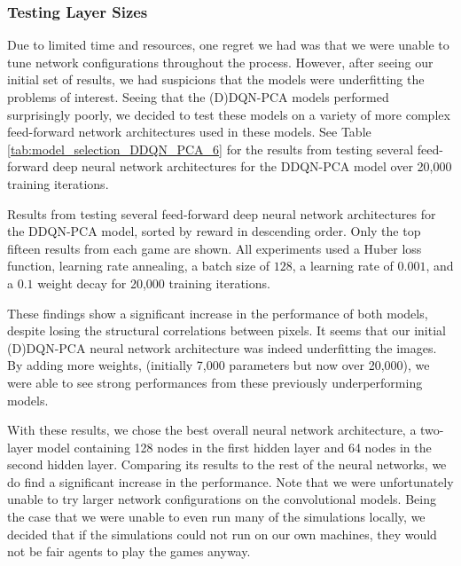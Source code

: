 \documentclass[11pt]{article}
\begin{document}
\subsubsection{Testing Layer Sizes}

Due to limited time and resources, one regret we had was that we were unable to tune network configurations throughout the process. However, after seeing our initial set of results, we had suspicions that the models were underfitting the problems of interest. Seeing that the (D)DQN-PCA models performed surprisingly poorly, we decided to test these models on a variety of more complex feed-forward network architectures used in these models. See Table \ref{tab:model_selection_DDQN_PCA_6} for the results from testing several feed-forward deep neural network architectures for the DDQN-PCA model over 20,000 training iterations.

\begin{table}[!ht]
    \footnotesize
    \centering
    
    
    \caption{Results from testing several feed-forward deep neural network architectures for the DDQN-PCA model, sorted by reward in descending order. Only the top fifteen results from each game are shown. All experiments used a Huber loss function, learning rate annealing, a batch size of $128$, a learning rate of $0.001$, and a $0.1$ weight decay for 20,000 training iterations.}
    \label{tab:model_selection_DDQN_PCA_6}
\end{table}

These findings show a significant increase in the performance of both models, despite losing the structural correlations between pixels. It seems that our initial (D)DQN-PCA neural network architecture was indeed underfitting the images. By adding more weights, (initially 7,000 parameters but now over 20,000), we were able to see strong performances from these previously underperforming models.

With these results, we chose the best overall neural network architecture, a two-layer model containing 128 nodes in the first hidden layer and 64 nodes in the second hidden layer. Comparing its results to the rest of the neural networks, we do find a significant increase in the performance. Note that we were unfortunately unable to try larger network configurations on the convolutional models. Being the case that we were unable to even run many of the simulations locally, we decided that if the simulations could not run on our own machines, they would not be fair agents to play the games anyway.
\end{document}
